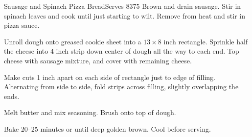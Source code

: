 \begin{recipe}{Sausage and Spinach Pizza Bread}{Serves 8}{375\0}
    Brown and drain sausage. Stir in spinach leaves and cook until just starting to wilt. Remove from heat and stir in pizza sauce.

    Unroll dough onto greased cookie sheet into a $13\times 8$ inch rectangle. Sprinkle half the cheese into 4 inch strip down center of dough all the way to each end. Top cheese with sausage mixture, and cover with remaining cheese.

    \newstep
    Make cuts 1 inch apart on each side of rectangle just to edge of filling. Alternating from side to side, fold strips across filling, slightly overlapping the ends.

    Melt butter and mix seasoning. Brush onto top of dough.

    \newstep
    Bake 20--25 minutes or until deep golden brown. Cool before serving.
\end{recipe}
